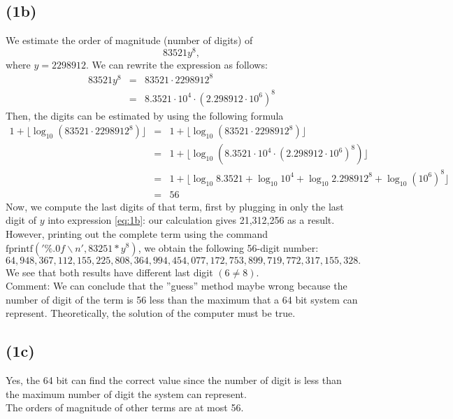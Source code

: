 \documentclass[11pt]{article}
\newcommand{\1}{\mathbbm{1}}
\begin{document}
\subsection*{(1b)}
We estimate the order of magnitude (number of digits) of 
\begin{equation}\label{eq:1b}
83521y^8,
\end{equation}
where $y=2298912$. We can rewrite the expression as follows:
	\begin{eqnarray*}
		83521y^8 &=& 83521\cdot 2298912^8\\
				 &=& 8.3521\cdot10^4 \cdot (2.298912\cdot10^6)^8
	\end{eqnarray*}
Then, the digits can be estimated by using the following formula 
	\begin{eqnarray*}
		1+\lfloor \log_{10} (83521\cdot 2298912^8)\rfloor &=& 1+\lfloor \log_{10} (83521\cdot 2298912^8)\rfloor\\
		&=&  1+\lfloor \log_{10} (8.3521\cdot10^4 \cdot (2.298912\cdot10^6)^8)\rfloor\\
			&=&  1+\lfloor \log_{10} 8.3521+\log_{10}10^4 + \log_{10}2.298912^8 +\log_{10} (10^6)^8\rfloor\\
			&=& 56
	\end{eqnarray*} 
Now, we compute the last digits of that term, first by plugging in only the last digit of $y$ into expression \eqref{eq:1b}: our calculation gives 21,312,256 as a result. However, printing out the complete term using the command $\text{fprintf}('\%.0f\backslash n',83251*y^8)$, we obtain the following 56-digit number:
\[64,948,367,112,155,225,808,364,994,454,077,172,753,899,719,772,317,155,328.\] 
We see that both results have different last digit $(6\neq8)$.\\
Comment: We can conclude that the ''guess'' method maybe wrong because the number of digit of the term is 56 less than the maximum that a 64 bit system can represent. Theoretically, the solution of the computer must be true.
\subsection*{(1c)}
Yes, the 64 bit can find the correct value since the number of digit is less than the maximum number of digit the system can represent.\\
The orders of magnitude of other terms are at most 56. 

	
\end{document}
